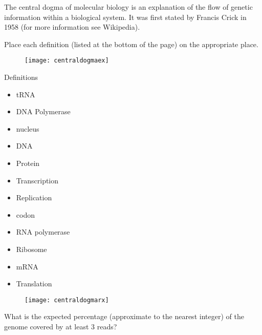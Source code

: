 \begin{Exercise} [
  label={ex41},
  origin={G. Valle}
 ]

The central dogma of molecular biology is an explanation of the flow of genetic
information within a biological system. It was first stated by Francis Crick in
1958 (for more information see Wikipedia).

\Question Place each definition (listed at the bottom of the page) on the
appropriate place.

\begin{figure}[H]
\centering
\texttt{[image: centraldogmaex]}
\end{figure}

Definitions
\begin{itemize}
\item tRNA
\item DNA Polymerase
\item nucleus
\item DNA
\item Protein
\item Transcription
\item Replication
\item codon
\item RNA polymerase
\item Ribosome
\item mRNA
\item Translation
\end{itemize}

\end{Exercise}

\begin{Answer} [
  ref={ex41},
  number={1}
 ]

\Question 
\begin{figure}[H]
\centering
\texttt{[image: centraldogmarx]}
\end{figure}

\end{Answer}

\begin{Exercise} [
  label={ex42},
  origin={G. Valle}
 ]

\Question What is the expected percentage (approximate to the nearest integer)
of the genome covered by at least 3 reads?

\end{Exercise}

